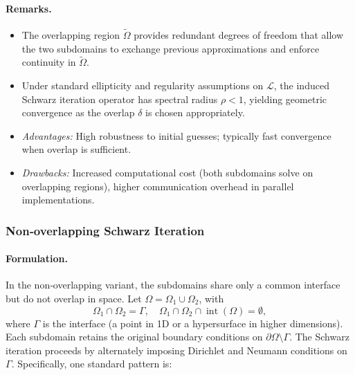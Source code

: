 \documentclass[12pt]{article}
\begin{document}
\paragraph{Remarks.}
\begin{itemize}
  \item The overlapping region \(\widetilde\Omega\) provides redundant degrees of freedom that allow the two subdomains to exchange previous approximations and enforce continuity in \(\widetilde\Omega\).
  \item Under standard ellipticity and regularity assumptions on \(\mathcal{L}\), the induced Schwarz iteration operator has spectral radius \(\rho < 1\)\cite{glowinski_first_1988,quarteroni_domain_1999}, yielding geometric convergence as the overlap \(\delta\) is chosen appropriately.
  \item \emph{Advantages:} High robustness to initial guesses; typically fast convergence when overlap is sufficient.  
  \item \emph{Drawbacks:} Increased computational cost (both subdomains solve on overlapping regions), higher communication overhead in parallel implementations.
\end{itemize}

\subsubsection{Non‐overlapping Schwarz Iteration}

\paragraph{Formulation.}
In the non‐overlapping variant, the subdomains share only a common interface but do not overlap in space\cite{gander_schwarz_2008}.  Let \(\Omega = \Omega_1 \cup \Omega_2\), with
\begin{equation}
  \Omega_1 \cap \Omega_2 = \Gamma, 
  \quad
  \Omega_1 \cap \Omega_2 \cap \operatorname{int}(\Omega) = \emptyset,
\end{equation}
where \(\Gamma\) is the interface (a point in 1D or a hypersurface in higher dimensions).  Each subdomain retains the original boundary conditions on \(\partial\Omega\setminus\Gamma\).  The Schwarz iteration proceeds by alternately imposing Dirichlet and Neumann conditions on \(\Gamma\).  Specifically, one standard pattern is:
\end{document}
